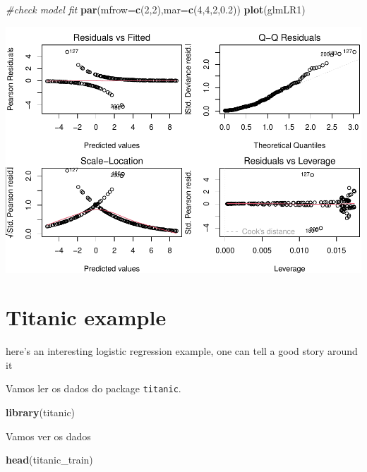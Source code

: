 \documentclass[
]{book}
\newenvironment{Shaded}{\begin{snugshade}}{\end{snugshade}}
\newcommand{\AttributeTok}[1]{\textcolor[rgb]{0.13,0.29,0.53}{#1}}
\newcommand{\CommentTok}[1]{\textcolor[rgb]{0.56,0.35,0.01}{\textit{#1}}}
\newcommand{\DecValTok}[1]{\textcolor[rgb]{0.00,0.00,0.81}{#1}}
\newcommand{\FloatTok}[1]{\textcolor[rgb]{0.00,0.00,0.81}{#1}}
\newcommand{\FunctionTok}[1]{\textcolor[rgb]{0.13,0.29,0.53}{\textbf{#1}}}
\newcommand{\NormalTok}[1]{#1}
\begin{document}
\begin{Shaded}
\begin{Highlighting}[]
\CommentTok{\#check model fit}
\FunctionTok{par}\NormalTok{(}\AttributeTok{mfrow=}\FunctionTok{c}\NormalTok{(}\DecValTok{2}\NormalTok{,}\DecValTok{2}\NormalTok{),}\AttributeTok{mar=}\FunctionTok{c}\NormalTok{(}\DecValTok{4}\NormalTok{,}\DecValTok{4}\NormalTok{,}\DecValTok{2}\NormalTok{,}\FloatTok{0.2}\NormalTok{))}
\FunctionTok{plot}\NormalTok{(glmLR1)}
\end{Highlighting}
\end{Shaded}

\includegraphics{ECOMODbook_files/figure-latex/unnamed-chunk-43-2.pdf}

\hypertarget{titanic-example}{%
\section{Titanic example}\label{titanic-example}}

here's an interesting logistic regression example, one can tell a good story around it

Vamos ler os dados do package \texttt{titanic}.

\begin{Shaded}
\begin{Highlighting}[]
\FunctionTok{library}\NormalTok{(titanic)}
\end{Highlighting}
\end{Shaded}

Vamos ver os dados

\begin{Shaded}
\begin{Highlighting}[]
\FunctionTok{head}\NormalTok{(titanic\_train)}
\end{Highlighting}
\end{Shaded}
\end{document}
